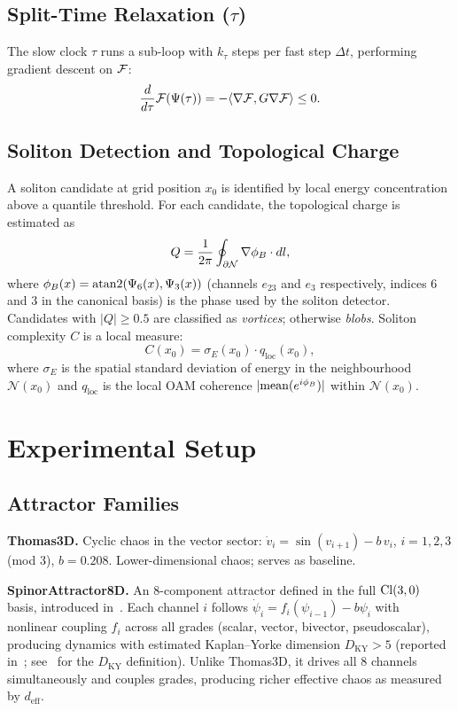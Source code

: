 \documentclass[11pt,a4paper]{article}
\begin{document}
\subsection{Split-Time Relaxation ($\tau$)}

The slow clock $\tau$ runs a sub-loop with $k_\tau$ steps per fast step
$\Delta t$, performing gradient descent on $\mathcal{F}$:
\[
  \frac{d}{d\tau}\mathcal{F}(\Psi(\tau)) = -\langle \nabla\mathcal{F}, G\nabla\mathcal{F} \rangle \leq 0.
\]

\subsection{Soliton Detection and Topological Charge}

A soliton candidate at grid position $x_0$ is identified by
local energy concentration above a quantile threshold.
For each candidate, the topological charge is estimated as
\[
  Q = \frac{1}{2\pi} \oint_{\partial \mathcal{N}} \nabla \phi_B \cdot dl,
\]
where $\phi_B(x) = \operatorname{atan2}(\Psi_6(x), \Psi_3(x))$
(channels $e_{23}$ and $e_3$ respectively, indices 6 and 3 in the canonical basis)
is the phase used by the soliton detector.
Candidates with $|Q| \geq 0.5$ are classified as \emph{vortices};
otherwise \emph{blobs}.
Soliton complexity $C$ is a local measure:
\[
  C(x_0) = \sigma_E(x_0) \cdot q_{\mathrm{loc}}(x_0),
\]
where $\sigma_E$ is the spatial standard deviation of energy in the
neighbourhood $\mathcal{N}(x_0)$ and $q_{\mathrm{loc}}$ is the local
OAM coherence $|\mathrm{mean}(e^{i\phi_B})|$ within $\mathcal{N}(x_0)$.

\section{Experimental Setup}

\subsection{Attractor Families}

\noindent\textbf{Thomas3D.}
Cyclic chaos in the vector sector:
$\dot{v}_i = \sin(v_{i+1}) - b\, v_i$,
$i = 1,2,3$ (mod 3), $b = 0.208$.
Lower-dimensional chaos; serves as baseline.

\medskip
\noindent\textbf{SpinorAttractor8D.}
An 8-component attractor defined in the full $\mathrm{Cl}(3,0)$ basis, introduced
in~\cite{zenodo_p00}.
Each channel $i$ follows $\dot{\psi}_i = f_i(\psi_{i-1}) - b\psi_i$
with nonlinear coupling $f_i$ across all grades (scalar, vector, bivector,
pseudoscalar), producing dynamics with estimated Kaplan--Yorke dimension
$D_{\mathrm{KY}} > 5$ (reported in~\cite{zenodo_p00};
see~\cite{kaplan1979} for the $D_{\mathrm{KY}}$ definition).
Unlike Thomas3D, it drives all 8 channels simultaneously and couples
grades, producing richer effective chaos as measured by $d_{\mathrm{eff}}$.
\end{document}
